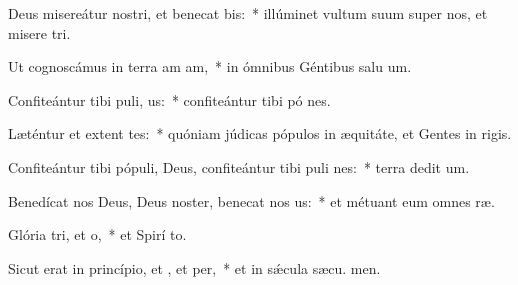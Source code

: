 \item Deus misereátur nostri, et benecat bis:~* illúminet vultum suum super nos, et misere tri.
\item Ut cognoscámus in terra am am,~* in ómnibus Géntibus salu um.
\item Confiteántur tibi puli, us:~* confiteántur tibi pó nes.
\item Læténtur et extent tes:~* quóniam júdicas pópulos in æquitáte, et Gentes in  rigis.
\item Confiteántur tibi pópuli, Deus, confiteántur tibi puli nes:~* terra dedit  um.
\item Benedícat nos Deus, Deus noster, benecat nos us:~* et métuant eum omnes  ræ.
\item Glória tri, et o,~* et Spirí to.
\item Sicut erat in princípio, et , et per,~* et in sǽcula sæcu. men.
